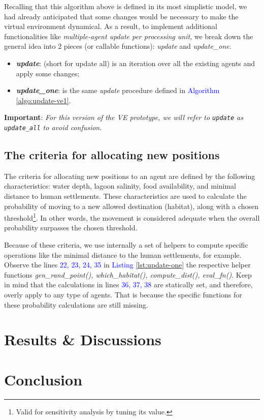 Recalling that this algorithm above is defined in its most simplistic model, we had already anticipated that some changes would be necessary to make the virtual environment dynamical. As a result, to implement additional functionalities like \emph{multiple-agent update per processing unit}, we break down the general idea into 2 pieces (or callable functions): \emph{update} and \emph{update\_one}.
\begin{itemize}
    \item \textbf{\textit{update}}: (short for update all) is an iteration over all the existing agents and apply some changes;
    \item \textbf{\textit{update\_one}}: is the same \emph{update} procedure defined in \textcolor{blue}{Algorithm} \ref{algo:update-ve1}.
\end{itemize}
\noindent
\textbf{Important}: \textit{For this version of the VE prototype, we will refer to \texttt{update} as \texttt{update\_all} to avoid confusion.}

\subsection{The criteria for allocating new positions}
The criteria for allocating new positions to an agent are defined by the following characteristics: water depth, lagoon salinity, food availability, and minimal distance to human settlements. These characteristics are used to calculate the probability of moving to a new allowed destination (habitat), along with a chosen threshold\footnote{Valid for sensitivity analysis by tuning its value.}. In other words, the movement is considered adequate when the overall probability surpasses the chosen threshold.

Because of these criteria, we use internally a set of helpers to compute specific operations like the minimal distance to the human settlements, for example. Observe the lines \textcolor{blue}{22, 23, 24, 35} in \textcolor{blue}{Listing} \ref{lst:update-one} the respective helper functions \emph{gen\_rand\_point(), which\_habitat(), compute\_dist(), eval\_fn()}. Keep in mind that the calculations in lines \textcolor{blue}{36, 37, 38} are statically set, and therefore, overly apply to any type of agents. That is because the specific functions for these probability calculations are still missing.



\section{Results \& Discussions}

\section{Conclusion}
